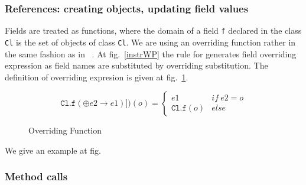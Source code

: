 \subsubsection{References: creating objects, updating field values}
Fields are treated as functions, where the domain of a field \texttt{f} 
declared in the class \texttt{Cl} is the set of objects of class \texttt{Cl}.
We are using an overriding function rather in the same fashion as in ~\cite{B00ppp}. 
At fig.~\ref{instrWP} the rule for  generates field overriding expression 
as field names are substituted by overriding substitution. The definition of overriding expresion is
given at fig.~\ref{override}.

\begin{figure}
$$
 \texttt{Cl.f}(\oplus e2 \rightarrow e1)])(o) = \left\{ \begin{array} {ll}
						       e1 & if \ e2 = o \\
					               \texttt{Cl.f}(o)	& else 
	\end{array}\right. 
$$ 
\caption{Overriding Function}
\label{override}
\end{figure}
We give an example at fig.%



\subsubsection{Method calls}
